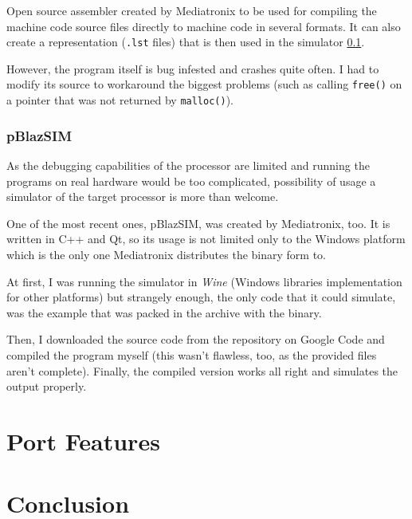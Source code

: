         Open source assembler created by Mediatronix to be used for compiling the machine code source files directly to machine code in several formats. It can also create a representation (\texttt{.lst} files) that is then used in the simulator \ref{pblazsim}.

        However, the program itself is bug infested and crashes quite often. I had to modify its source to workaround the biggest problems (such as calling \texttt{free()} on a pointer that was not returned by \texttt{malloc()}).

        \subsection{pBlazSIM}\label{pblazsim}

        As the debugging capabilities of the processor are limited and running the programs on real hardware would be too complicated, possibility of usage a simulator of the target processor is more than welcome.

        One of the most recent ones, pBlazSIM, was created by Mediatronix, too. It is written in C++ and Qt, so its usage is not limited only to the Windows platform which is the only one Mediatronix distributes the binary form to.

        At first, I was running the simulator in \emph{Wine} (Windows libraries implementation for other platforms) but strangely enough, the only code that it could simulate, was the example that was packed in the archive with the binary.

        Then, I downloaded the source code from the repository on Google Code and compiled the program myself (this wasn't flawless, too, as the provided files aren't complete). Finally, the compiled version works all right and simulates the output properly.

        

\chapter{Port Features}\label{features}

\chapter{Conclusion}\label{conclusion}


\cite{TBD}
